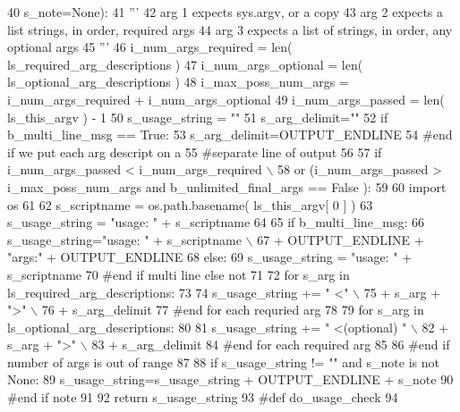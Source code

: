 \begin{DoxyCode}
40         s\_note=\textcolor{keywordtype}{None}):
41     \textcolor{stringliteral}{'''}
42 \textcolor{stringliteral}{    arg 1 expects sys.argv, or a copy}
43 \textcolor{stringliteral}{    arg 2 expects a list strings, in order, required args}
44 \textcolor{stringliteral}{    arg 3 expects a list of strings, in order, any optional args}
45 \textcolor{stringliteral}{    '''}
46     i\_num\_args\_required = len( ls\_required\_arg\_descriptions )
47     i\_num\_args\_optional = len( ls\_optional\_arg\_descriptions )
48     i\_max\_poss\_num\_args = i\_num\_args\_required + i\_num\_args\_optional 
49     i\_num\_args\_passed = len( ls\_this\_argv ) - 1  
50     s\_usage\_string = \textcolor{stringliteral}{""}
51     s\_arg\_delimit=\textcolor{stringliteral}{""}
52     \textcolor{keywordflow}{if} b\_multi\_line\_msg == \textcolor{keyword}{True}:
53         s\_arg\_delimit=OUTPUT\_ENDLINE
54     \textcolor{comment}{#end if we put each arg descript on a }
55     \textcolor{comment}{#separate line of output}
56 
57     \textcolor{keywordflow}{if} i\_num\_args\_passed <  i\_num\_args\_required  \(\backslash\)
58             \textcolor{keywordflow}{or} (i\_num\_args\_passed > i\_max\_poss\_num\_args \textcolor{keywordflow}{and} b\_unlimited\_final\_args == \textcolor{keyword}{False} ): 
59     
60         \textcolor{keyword}{import} os
61         
62         s\_scriptname = os.path.basename( ls\_this\_argv[ 0 ] )    
63         s\_usage\_string = \textcolor{stringliteral}{"usage: "} + s\_scriptname 
64 
65         \textcolor{keywordflow}{if} b\_multi\_line\_msg:
66             s\_usage\_string=\textcolor{stringliteral}{"usage: "} + s\_scriptname \(\backslash\)
67                     + OUTPUT\_ENDLINE + \textcolor{stringliteral}{"args:"} + OUTPUT\_ENDLINE
68         \textcolor{keywordflow}{else}:
69             s\_usage\_string = \textcolor{stringliteral}{"usage: "} + s\_scriptname 
70         \textcolor{comment}{#end if multi line else not}
71 
72         \textcolor{keywordflow}{for} s\_arg \textcolor{keywordflow}{in} ls\_required\_arg\_descriptions:
73 
74             s\_usage\_string += \textcolor{stringliteral}{" <"} \(\backslash\)
75                 + s\_arg + \textcolor{stringliteral}{">"} \(\backslash\)
76                 + s\_arg\_delimit
77         \textcolor{comment}{#end for each requried arg}
78 
79         \textcolor{keywordflow}{for} s\_arg \textcolor{keywordflow}{in} ls\_optional\_arg\_descriptions:
80 
81             s\_usage\_string += \textcolor{stringliteral}{" <(optional) "} \(\backslash\)
82                 + s\_arg + \textcolor{stringliteral}{">"} \(\backslash\)
83                 + s\_arg\_delimit
84         \textcolor{comment}{#end for each required arg}
85 
86     \textcolor{comment}{#end if number of args is out of range}
87 
88     \textcolor{keywordflow}{if} s\_usage\_string != \textcolor{stringliteral}{""} \textcolor{keywordflow}{and} s\_note \textcolor{keywordflow}{is} \textcolor{keywordflow}{not} \textcolor{keywordtype}{None}:
89         s\_usage\_string=s\_usage\_string + OUTPUT\_ENDLINE + s\_note
90     \textcolor{comment}{#end if note }
91 
92     \textcolor{keywordflow}{return}  s\_usage\_string 
93 \textcolor{comment}{#def do\_usage\_check}
94 
\end{DoxyCode}
